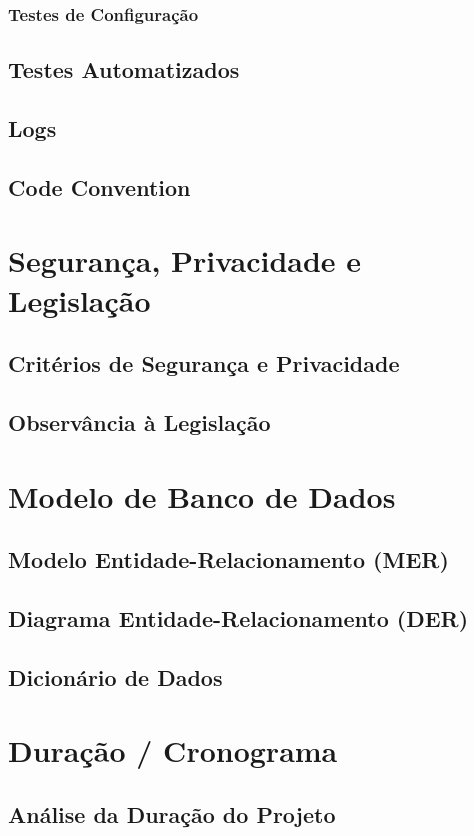 \subsubsection{Testes de Configuração}
\subsection{Testes Automatizados}
\subsection{Logs}
\subsection{Code Convention}

\section{Segurança, Privacidade e Legislação}
\subsection{Critérios de Segurança e Privacidade}
\subsection{Observância à Legislação}

\section{Modelo de Banco de Dados}
\subsection{Modelo Entidade-Relacionamento (MER)}
\subsection{Diagrama Entidade-Relacionamento (DER)}
\subsection{Dicionário de Dados}

\section{Duração / Cronograma}
\subsection{Análise da Duração do Projeto}